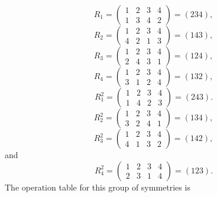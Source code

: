 \documentclass[11pt,a4paper]{article}
\begin{document}
\[R_1 = \begin{pmatrix}1&2&3&4\\1&3&4&2\end{pmatrix} = (234),\]
\[R_2 = \begin{pmatrix}1&2&3&4\\4&2&1&3\end{pmatrix} = (143),\]
\[R_3 = \begin{pmatrix}1&2&3&4\\2&4&3&1\end{pmatrix} = (124),\]
\[R_4 = \begin{pmatrix}1&2&3&4\\3&1&2&4\end{pmatrix} = (132),\]
\[R_1^2 = \begin{pmatrix}1&2&3&4\\1&4&2&3\end{pmatrix} = (243).\]
\[R_2^2 = \begin{pmatrix}1&2&3&4\\3&2&4&1\end{pmatrix} = (134),\]
\[R_3^2 = \begin{pmatrix}1&2&3&4\\4&1&3&2\end{pmatrix} = (142),\]
and
\[R_4^2 = \begin{pmatrix}1&2&3&4\\2&3&1&4\end{pmatrix} = (123).\]
The operation table for this group of symmetries is
\end{document}

